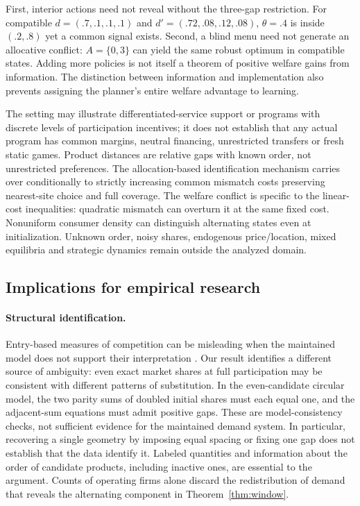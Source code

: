 \documentclass[11pt]{article}
\begin{document}
First, interior actions need not reveal without the three-gap restriction. For compatible $d=(.7,.1,.1,.1)$ and $d'=(.72,.08,.12,.08)$, $\theta=.4$ is inside $(.2,.8)$ yet a common signal exists. Second, a blind menu need not generate an allocative conflict: $A=\{0,3\}$ can yield the same robust optimum in compatible states. Adding more policies is not itself a theorem of positive welfare gains from information. The distinction between information and implementation also prevents assigning the planner's entire welfare advantage to learning.

The setting may illustrate differentiated-service support or programs with discrete levels of participation incentives; it does not establish that any actual program has common margins, neutral financing, unrestricted transfers or fresh static games. Product distances are relative gaps with known order, not unrestricted preferences. The allocation-based identification mechanism carries over conditionally to strictly increasing common mismatch costs preserving nearest-site choice and full coverage. The welfare conflict is specific to the linear-cost inequalities: quadratic mismatch can overturn it at the same fixed cost. Nonuniform consumer density can distinguish alternating states even at initialization. Unknown order, noisy shares, endogenous price/location, mixed equilibria and strategic dynamics remain outside the analyzed domain.

\subsection{Implications for empirical research}\label{sec:empirical}

\paragraph{Structural identification.} Entry-based measures of competition can be misleading when the maintained model does not support their interpretation \citep{kesternich2020}. Our result identifies a different source of ambiguity: even exact market shares at full participation may be consistent with different patterns of substitution. In the even-candidate circular model, the two parity sums of doubled initial shares must each equal one, and the adjacent-sum equations must admit positive gaps. These are model-consistency checks, not sufficient evidence for the maintained demand system. In particular, recovering a single geometry by imposing equal spacing or fixing one gap does not establish that the data identify it. Labeled quantities and information about the order of candidate products, including inactive ones, are essential to the argument. Counts of operating firms alone discard the redistribution of demand that reveals the alternating component in Theorem~\ref{thm:window}.
\end{document}
